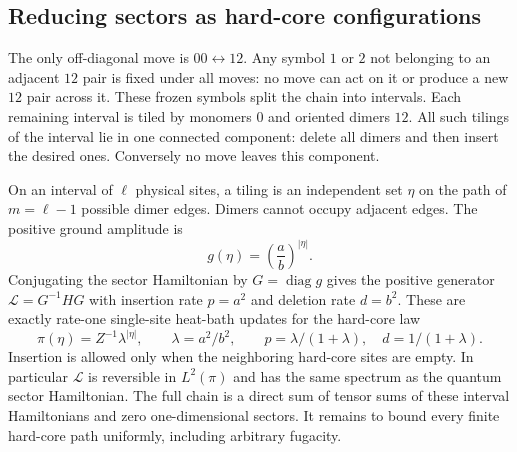 \documentclass[11pt,a4paper]{article}
\theoremstyle{remark}\newtheorem{remark}[theorem]{Remark}
\newcommand{\diag}{\operatorname{diag}}
\begin{document}
\subsection{Reducing sectors as hard-core configurations}
The only off-diagonal move is $00\leftrightarrow12$. Any symbol $1$ or $2$ not belonging to an adjacent $12$ pair is fixed under all moves: no move can act on it or produce a new $12$ pair across it. These frozen symbols split the chain into intervals. Each remaining interval is tiled by monomers $0$ and oriented dimers $12$. All such tilings of the interval lie in one connected component: delete all dimers and then insert the desired ones. Conversely no move leaves this component.

On an interval of $\ell$ physical sites, a tiling is an independent set $\eta$ on the path of $m=\ell-1$ possible dimer edges. Dimers cannot occupy adjacent edges. The positive ground amplitude is
\[
 g(\eta)=\left(\frac ab\right)^{|\eta|}.
\]
Conjugating the sector Hamiltonian by $G=\diag g$ gives the positive generator $\mathcal L=G^{-1}H G$ with insertion rate $p=a^2$ and deletion rate $d=b^2$. These are exactly rate-one single-site heat-bath updates for the hard-core law
\[
 \pi(\eta)=Z^{-1}\lambda^{|\eta|},\qquad \lambda=a^2/b^2,
 \qquad p=\lambda/(1+\lambda),\quad d=1/(1+\lambda).
\]
Insertion is allowed only when the neighboring hard-core sites are empty. In particular $\mathcal L$ is reversible in $L^2(\pi)$ and has the same spectrum as the quantum sector Hamiltonian. The full chain is a direct sum of tensor sums of these interval Hamiltonians and zero one-dimensional sectors. It remains to bound every finite hard-core path uniformly, including arbitrary fugacity.
\end{document}
